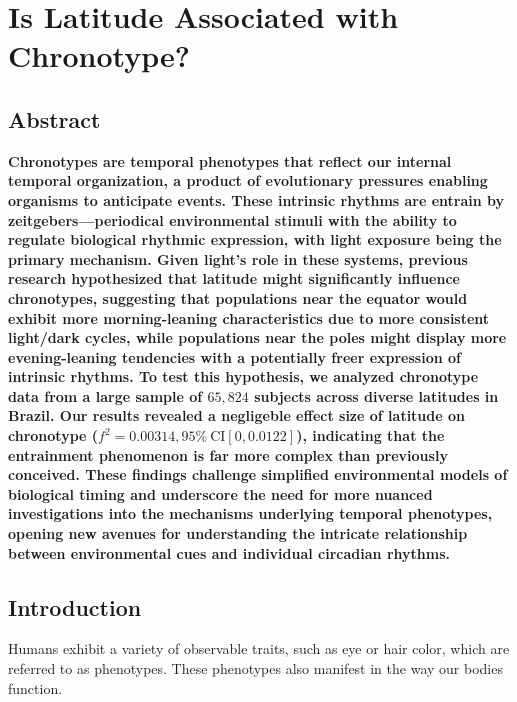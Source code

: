 \documentclass[
12pt,
openright,
oneside,
a4paper,
chapter=TITLE,
section=TITLE,
french,
spanish,
brazil,
english
]{abntex2}
\newlength{\hugeskipamount}
\begin{document}
\vspace{\hugeskipamount}


\chapter{Is Latitude Associated with
Chronotype?}\label{sec-latitude-hypothesis-article}

\section{Abstract}\label{abstract}

\noindent \textbf{Chronotypes are temporal phenotypes that reflect our
internal temporal organization, a product of evolutionary pressures
enabling organisms to anticipate events. These intrinsic rhythms are
entrain by zeitgebers---periodical environmental stimuli with the
ability to regulate biological rhythmic expression, with light exposure
being the primary mechanism. Given light's role in these systems,
previous research hypothesized that latitude might significantly
influence chronotypes, suggesting that populations near the equator
would exhibit more morning-leaning characteristics due to more
consistent light/dark cycles, while populations near the poles might
display more evening-leaning tendencies with a potentially freer
expression of intrinsic rhythms. To test this hypothesis, we analyzed
chronotype data from a large sample of \(65,824\) subjects across
diverse latitudes in Brazil. Our results revealed a negligeble effect
size of latitude on chronotype
(\(f^2 = 0.00314, 95\% \ \text{CI}[0, 0.0122]\)), indicating that the
entrainment phenomenon is far more complex than previously conceived.
These findings challenge simplified environmental models of biological
timing and underscore the need for more nuanced investigations into the
mechanisms underlying temporal phenotypes, opening new avenues for
understanding the intricate relationship between environmental cues and
individual circadian rhythms.}

\section{Introduction}\label{introduction}

Humans exhibit a variety of observable traits, such as eye or hair
color, which are referred to as phenotypes. These phenotypes also
manifest in the way our bodies function.
\end{document}

